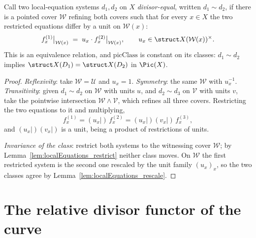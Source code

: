 \begin{lemma}
  \label{lem:localEquations_divEq}
  \leanok
  Call two local-equation systems \(d_1, d_2\) on \(X\) \emph{divisor-equal}, written
  \(d_1 \sim d_2\), if there is a pointed cover \(\mathcal W\) refining both covers such
  that for every \(x \in X\) the two restricted equations differ by a unit on
  \(\mathcal W(x)\):
  \[
    f^{(1)}_x\big|_{\mathcal W(x)} \;=\; u_x \cdot f^{(2)}_x\big|_{\mathcal W(x)},
    \qquad u_x \in \struct X(\mathcal W(x))^{\times}.
  \]
  This is an equivalence relation, and \(\mathrm{picClass}\) is constant on its classes:
  \(d_1 \sim d_2\) implies \(\struct X(D_1) = \struct X(D_2)\) in \(\Pic(X)\).
\end{lemma}
\begin{proof}
  \leanok
  \emph{Reflexivity}: take \(\mathcal W = \mathcal U\) and \(u_x = 1\).
  \emph{Symmetry}: the same \(\mathcal W\) with \(u_x^{-1}\).
  \emph{Transitivity}: given \(d_1 \sim d_2\) on \(\mathcal W\) with units \(u\), and
  \(d_2 \sim d_3\) on \(\mathcal V\) with units \(v\), take the pointwise intersection
  \(\mathcal W \wedge \mathcal V\), which refines all three covers. Restricting the two
  equations to it and multiplying,
  \[
    f^{(1)}_x = (u_x|)\,f^{(2)}_x = (u_x|)(v_x|)\, f^{(3)}_x ,
  \]
  and \((u_x|)(v_x|)\) is a unit, being a product of restrictions of units.

  \emph{Invariance of the class}: restrict both systems to the witnessing cover
  \(\mathcal W\); by Lemma~\ref{lem:localEquations_restrict} neither class moves. On
  \(\mathcal W\) the first restricted system is the second one rescaled by the unit family
  \((u_x)_x\), so the two classes agree by Lemma~\ref{lem:localEquations_rescale}.
\end{proof}

\section{The relative divisor functor of the curve}
\label{sec:divfam}

